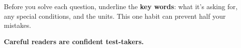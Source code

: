 {\begin{tcolorbox}[
    enhanced,
    colback=funYellowLight,
    colframe=funYellow!60,
    arc=10pt,
    boxrule=1pt,
    left=6mm, right=6mm, top=4mm, bottom=4mm,
]
\vspace{2mm}

Before you solve each question, underline the \textbf{key words}: what it's asking for, any special conditions, and the units. This one habit can prevent half your mistakes.
\end{tcolorbox}

\vspace{4mm}

\begin{center}
{\large\bfseries\color{funPurpleDark} \faGem\hspace{2mm}Careful readers are confident test-takers.\hspace{2mm}\faGem}
\end{center}

}
\newpage
